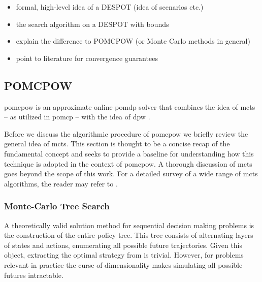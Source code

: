 \begin{itemize}
  \item formal, high-level idea of a DESPOT (idea of scenarios etc.)
  \item the search algorithm on a DESPOT with bounds
  \item explain the difference to POMCPOW (or Monte Carlo methods in general)
  \item point to literature for convergence guarantees
\end{itemize}


\subsection{POMCPOW}

\acf{pomcpow} is an approximate online \ac{pomdp} solver that combines the idea
of \ac{mcts} -- as utilized in \ac{pomcp} \cite{silver2010pomcp} -- with the
idea of \ac{dpw} \cite{sunberg2018online}.

Before we discuss the algorithmic procedure of \ac{pomcpow} we briefly review
the general idea of \ac{mcts}. This section is thought to be a concise recap of
the fundamental concept and seeks to provide a baseline for understanding how
this technique is adopted in the context of \ac{pomcpow}. A thorough discussion
of \ac{mcts} goes beyond the scope of this work. For a detailed survey of
a wide range of \ac{mcts} algorithms, the reader may refer to
\cite{browne2012survey}.

\subsubsection{Monte-Carlo Tree Search}

A theoretically valid solution method for sequential decision making problems
is the construction of the entire policy tree. This tree consists of alternating
layers of states and actions, enumerating all possible future trajectories.
Given this object, extracting the optimal strategy from is trivial. However,
for problems relevant in practice the curse of dimensionality makes simulating
all possible futures intractable.

